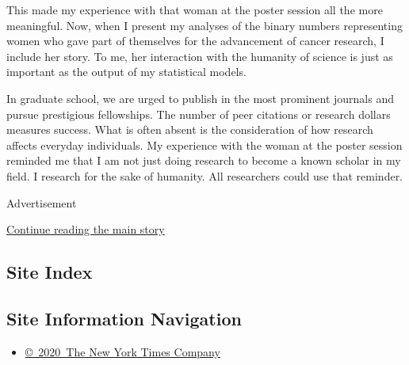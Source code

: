 This made my experience with that woman at the poster session all the
more meaningful. Now, when I present my analyses of the binary numbers
representing women who gave part of themselves for the advancement of
cancer research, I include her story. To me, her interaction with the
humanity of science is just as important as the output of my statistical
models.

In graduate school, we are urged to publish in the most prominent
journals and pursue prestigious fellowships. The number of peer
citations or research dollars measures success. What is often absent is
the consideration of how research affects everyday individuals. My
experience with the woman at the poster session reminded me that I am
not just doing research to become a known scholar in my field. I
research for the sake of humanity. All researchers could use that
reminder.

Advertisement

\protect\hyperlink{after-bottom}{Continue reading the main story}

\hypertarget{site-index}{%
\subsection{Site Index}\label{site-index}}

\hypertarget{site-information-navigation}{%
\subsection{Site Information
Navigation}\label{site-information-navigation}}

\begin{itemize}
\tightlist
\item
  \href{https://help.nytimes3xbfgragh.onion/hc/en-us/articles/115014792127-Copyright-notice}{©~2020~The
  New York Times Company}
\end{itemize}

